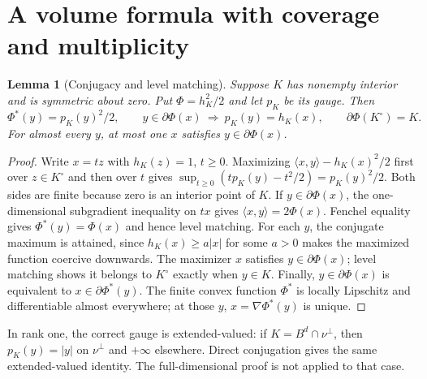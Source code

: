 \documentclass[10pt,reqno]{amsart}
\newtheorem{lemma}[theorem]{Lemma}
\theoremstyle{definition}
\theoremstyle{remark}
\newcommand{\ip}[2]{\langle #1,#2\rangle}
\begin{document}
\section{A volume formula with coverage and multiplicity}\label{sec:volume}
\begin{lemma}[Conjugacy and level matching]\label{lem:duality}
Suppose $K$ has nonempty interior and is symmetric about zero. Put $\Phi=h_K^2/2$ and let $p_K$ be its gauge. Then
\begin{equation}\label{eq:duality}
\Phi^*(y)=p_K(y)^2/2,\qquad
y\in\partial\Phi(x)\ \Longrightarrow\ p_K(y)=h_K(x),\qquad
\partial\Phi(K^\circ)=K.
\end{equation}
For almost every $y$, at most one $x$ satisfies $y\in\partial\Phi(x)$.
\end{lemma}
\begin{proof}
Write $x=t z$ with $h_K(z)=1$, $t\ge0$. Maximizing $\ip{x}{y}-h_K(x)^2/2$ first over $z\in K^\circ$ and then over $t$ gives
$\sup_{t\ge0}(tp_K(y)-t^2/2)=p_K(y)^2/2$.
Both sides are finite because zero is an interior point of $K$. If $y\in\partial\Phi(x)$, the one-dimensional subgradient inequality on $tx$ gives $\ip{x}{y}=2\Phi(x)$. Fenchel equality gives $\Phi^*(y)=\Phi(x)$ and hence level matching.
For each $y$, the conjugate maximum is attained, since $h_K(x)\ge a|x|$ for some $a>0$ makes the maximized function coercive downwards. The maximizer $x$ satisfies $y\in\partial\Phi(x)$; level matching shows it belongs to $K^\circ$ exactly when $y\in K$.
Finally, $y\in\partial\Phi(x)$ is equivalent to $x\in\partial\Phi^*(y)$. The finite convex function $\Phi^*$ is locally Lipschitz and differentiable almost everywhere; at those $y$, $x=\nabla\Phi^*(y)$ is unique.
\end{proof}
In rank one, the correct gauge is extended-valued: if $K=B^d\cap\nu^\perp$, then $p_K(y)=|y|$ on $\nu^\perp$ and $+\infty$ elsewhere. Direct conjugation gives the same extended-valued identity. The full-dimensional proof is not applied to that case.
\end{document}
